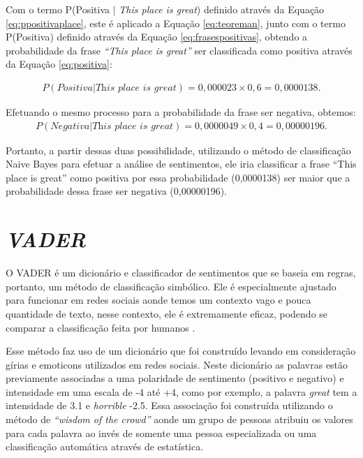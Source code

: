 Com o termo P(Positiva $\vert$ \textit{This place is great}) definido através da
Equação \ref{eq:ppositivaplace}, este é aplicado a Equação \ref{eq:teoreman},
junto com o termo P(Positiva) definido através da Equação \ref{eq:frasespositivas}, obtendo a probabilidade da frase
\textit{``This place is great''} ser classificada como positiva através da
Equação \ref{eq:positiva}:

\begin{equation}
\begin{gathered}
P(Positiva|\textit{This place is great})
=
0,000023 \times
0,6 = 0,0000138.
\label{eq:positiva}
\end{gathered}
\end{equation}

Efetuando o mesmo processo para a probabilidade da frase ser negativa, obtemos:
\begin{equation}
\begin{gathered}
P(Negativa|\textit{This place is great})
=
0,0000049 \times
0,4 = 0,00000196.
\label{eq:negativa}
\end{gathered}
\end{equation}

Portanto, a partir dessas duas possibilidade, utilizando o método de
classificação Naive Bayes para efetuar a análise de sentimentos, ele iria
classificar a frase ``This place is great'' como positiva por essa probabilidade
(0,0000138) ser maior que a probabilidade dessa frase ser negativa (0,00000196).



\section{\textit{VADER}}

O \ac{VADER} é um dicionário e classificador de sentimentos que se baseia em
regras, portanto, um método de classificação simbólico. Ele é especialmente
ajustado para funcionar em redes sociais aonde temos um contexto vago e pouca
quantidade de texto, nesse contexto, ele é extremamente eficaz, podendo se
comparar a classificação feita por humanos \cite{conf/icwsm/HuttoG14}.

Esse método faz uso de um dicionário que foi construído levando em consideração
gírias e emoticons utilizados em redes sociais. Neste dicionário as palavras
estão previamente associadas a uma polaridade de sentimento (positivo e
negativo) e intensidade em uma escala de -4 até +4, como por exemplo, a palavra
\textit{great} tem a intensidade de 3.1 e \textit{horrible} -2.5. Essa
associação foi construída utilizando o método de \textit{``wisdom of the
crowd''} aonde um grupo de pessoas atribuiu os valores para cada palavra ao
invés de somente uma pessoa especializada ou uma classificação automática
através de estatística.

